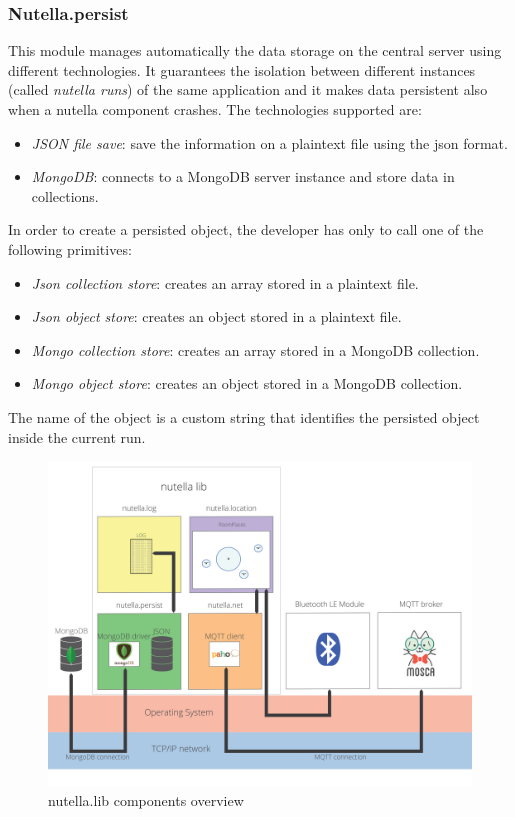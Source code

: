 \subsubsection{Nutella.persist}
This module manages automatically the data storage on the central server using different technologies. It guarantees the isolation between different instances (called \textit{nutella runs}) of the same application and it makes data persistent also when a nutella component crashes. The technologies supported are:
\begin{itemize}
\item \textit{JSON file save}: save the information on a plaintext file using the json format.
\item \textit{MongoDB}: connects to a MongoDB server instance and store data in collections.
\end{itemize}
In order to create a persisted object, the developer has only to call one of the following primitives:
\begin{itemize}
    \item \textit{Json collection store}: creates an array stored in a plaintext file.
    \item \textit{Json object store}: creates an object stored in a plaintext file.
    \item \textit{Mongo collection store}: creates an array stored in a MongoDB collection.
    \item \textit{Mongo object store}: creates an object stored in a MongoDB collection.
\end{itemize}
The name of the object is a custom string that identifies the persisted object inside the current run.

\begin{figure}
\centering
\includegraphics[width=6in]{images/nutella-overview.png}
\caption{nutella.lib components overview}
\label{fig:nutella_overview}
\end{figure}

